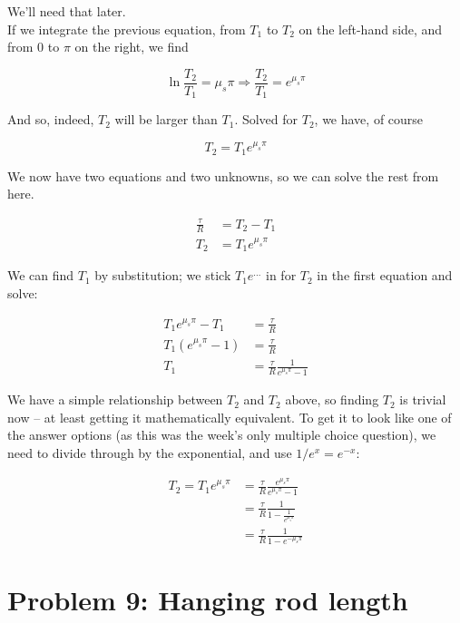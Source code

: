 \documentclass[8.01x]{subfiles}
\begin{document}
We'll need that later.\\
If we integrate the previous equation, from $T_1$ to $T_2$ on the left-hand side, and from $0$ to $\pi$ on the right, we find

\begin{equation}
\ln\frac{T_2}{T_1} = \mu_s \pi \Rightarrow \frac{T_2}{T_1} = e^{\mu_s \pi}
\end{equation}

And so, indeed, $T_2$ will be larger than $T_1$. Solved for $T_2$, we have, of course

\begin{equation}
T_2 = T_1 e^{\mu_s \pi}
\end{equation}

We now have two equations and two unknowns, so we can solve the rest from here.

\begin{align}
\frac{\tau}{R} &= T_2 - T_1\\
T_2 &= T_1 e^{\mu_s \pi}
\end{align}

We can find $T_1$ by substitution; we stick $T_1 e^{...}$ in for $T_2$ in the first equation and solve:

\begin{align}
T_1 e^{\mu_s \pi} - T_1 &= \frac{\tau}{R}\\
T_1 \left(e^{\mu_s \pi} - 1\right) &= \frac{\tau}{R}\\
T_1 &= \frac{\tau}{R} \frac{1}{e^{\mu_s \pi} - 1}
\end{align}

We have a simple relationship between $T_2$ and $T_2$ above, so finding $T_2$ is trivial now -- at least getting it mathematically equivalent. To get it to look like one of the answer options (as this was the week's only multiple choice question), we need to divide through by the exponential, and use $1/e^{x} = e^{-x}$:

\begin{align}
T_2 = T_1 e^{\mu_s \pi} &= \frac{\tau}{R} \frac{e^{\mu_s \pi}}{e^{\mu_s \pi} - 1}\\
                        &= \frac{\tau}{R} \frac{1}{1 - \frac{1}{e^{\mu_s \pi}}}\\
                        &= \frac{\tau}{R} \frac{1}{1 - e^{-\mu_s \pi}}
\end{align}

\section{Problem 9: Hanging rod length}
\end{document}
